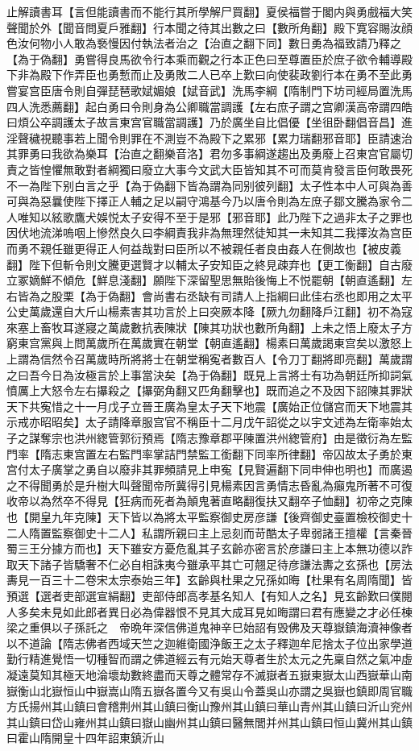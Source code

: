 止解讀書耳【言但能讀書而不能行其所學解尸買翻】夏侯福嘗于閣内與勇戲福大笑聲聞於外【聞音問夏戶雅翻】行本聞之待其出數之曰【數所角翻】殿下寛容賜汝顔色汝何物小人敢為䙝慢因付執法者治之【治直之翻下同】數日勇為福致請乃釋之【為于偽翻】勇嘗得良馬欲令行本乘而觀之行本正色曰至尊置臣於庶子欲令輔導殿下非為殿下作弄臣也勇慙而止及勇敗二人已卒上歎曰向使裴政劉行本在勇不至此勇嘗宴宫臣唐令則自彈琵琶歌娬媚娘【娬音武】洗馬李綱【隋制門下坊司經局置洗馬四人洗悉薦翻】起白勇曰令則身為公卿職當調護【左右庶子謂之宫卿漢高帝謂四皓曰煩公卒調護太子故言東宫官職當調護】乃於廣坐自比倡優【坐徂卧翻倡音昌】進淫聲穢視聽事若上聞令則罪在不測豈不為殿下之累邪【累力瑞翻邪音耶】臣請速治其罪勇曰我欲為樂耳【治直之翻樂音洛】君勿多事綱遂趨出及勇廢上召東宫官屬切責之皆惶懼無敢對者綱獨曰廢立大事今文武大臣皆知其不可而莫肯發言臣何敢畏死不一為陛下别白言之乎【為于偽翻下皆為謂為同别彼列翻】太子性本中人可與為善可與為惡曩使陛下擇正人輔之足以嗣守鴻基今乃以唐令則為左庶子鄒文騰為家令二人唯知以絃歌鷹犬娛悦太子安得不至于是邪【邪音耶】此乃陛下之過非太子之罪也因伏地流涕嗚咽上慘然良久曰李綱責我非為無理然徒知其一未知其二我擇汝為宫臣而勇不親任雖更得正人何益哉對曰臣所以不被親任者良由姦人在側故也【被皮義翻】陛下但斬令則文騰更選賢才以輔太子安知臣之終見疎弃也【更工衡翻】自古廢立冢嫡鮮不傾危【鮮息淺翻】願陛下深留聖思無貽後悔上不悦罷朝【朝直遙翻】左右皆為之股栗【為于偽翻】會尚書右丞缺有司請人上指綱曰此佳右丞也即用之太平公史萬歲還自大斤山楊素害其功言於上曰突厥本降【厥九勿翻降戶江翻】初不為寇來塞上畜牧耳遂寢之萬歲數抗表陳狀【陳其功狀也數所角翻】上未之悟上廢太子方窮東宫黨與上問萬歲所在萬歲實在朝堂【朝直遙翻】楊素曰萬歲謁東宫矣以激怒上上謂為信然令召萬歲時所將將士在朝堂稱寃者數百人【令刀丁翻將即亮翻】萬歲謂之曰吾今日為汝極言於上事當決矣【為于偽翻】既見上言將士有功為朝廷所抑詞氣憤厲上大怒令左右㩧殺之【㩧弼角翻又匹角翻擊也】既而追之不及因下詔陳其罪狀天下共寃惜之十一月戊子立晉王廣為皇太子天下地震【廣始正位儲宫而天下地震其示戒亦昭昭矣】太子請降章服宫官不稱臣十二月戊午詔從之以宇文述為左衛率始太子之謀奪宗也洪州緫管郭衍預焉【隋志豫章郡平陳置洪州緫管府】由是徵衍為左監門率【隋志東宫置左右監門率掌詰門禁監工銜翻下同率所律翻】帝囚故太子勇於東宫付太子廣掌之勇自以廢非其罪頻請見上申寃【見賢遍翻下同申伸也明也】而廣遏之不得聞勇於是升樹大叫聲聞帝所冀得引見楊素因言勇情志昏亂為癲鬼所著不可復收帝以為然卒不得見【狂病而死者為顛鬼著直略翻復扶又翻卒子恤翻】初帝之克陳也【開皇九年克陳】天下皆以為將太平監察御史房彦謙【後齊御史臺置檢校御史十二人隋置監察御史十二人】私謂所親曰主上忌刻而苛酷太子卑弱諸王擅權【言秦晉蜀三王分據方而也】天下雖安方憂危亂其子玄齡亦密言於彦謙曰主上本無功德以詐取天下諸子皆驕奢不仁必自相誅夷今雖承平其亡可翹足待彦謙法夀之玄孫也【房法夀見一百三十二卷宋太宗泰始三年】玄齡與杜果之兄孫如晦【杜果有名周隋聞】皆預選【選者吏部選宣絹翻】吏部侍郎高孝基名知人【有知人之名】見玄齡歎曰僕閱人多矣未見如此郎者異日必為偉器恨不見其大成耳見如晦謂曰君有應變之才必任棟梁之重俱以子孫託之　帝晩年深信佛道鬼神辛巳始詔有毁佛及天尊嶽鎮海瀆神像者以不道論【隋志佛者西域天竺之迦維衛國浄飯王之太子釋迦牟尼捨太子位出家學道勤行精進覺悟一切種智而謂之佛道經云有元始天尊者生於太元之先稟自然之氣冲虛凝遠莫知其極天地淪壞劫數終盡而天尊之體常存不滅嶽者五嶽東嶽太山西嶽華山南嶽衡山北嶽恒山中嶽嵩山隋五嶽各置今又有吳山令蓋吳山亦謂之吳嶽也鎮即周官職方氏揚州其山鎮曰會稽荆州其山鎮曰衡山豫州其山鎮曰華山青州其山鎮曰沂山兖州其山鎮曰岱山雍州其山鎮曰嶽山幽州其山鎮曰醫無閭并州其山鎮曰恒山冀州其山鎮曰霍山隋開皇十四年詔東鎮沂山